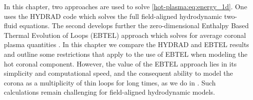 In this chapter, two approaches are used to solve \autoref{hot-plasma:eq:energy_1d}. One uses the HYDRAD code \citep{bradshaw_influence_2013} which solves the full field-aligned hydrodynamic two-fluid equations. The second develops further the zero-dimensional Enthalpy Based Thermal Evolution of Loops (EBTEL) approach which solves for average coronal plasma quantities \citep{klimchuk_highly_2008,cargill_enthalpy-based_2012,cargill_enthalpy-based_2012-1,cargill_modelling_2015}. In this chapter we compare the HYDRAD and EBTEL results and outline some restrictions that apply to the use of EBTEL when modeling the hot coronal component. However, the value of the EBTEL approach lies in its simplicity and computational speed, and the consequent ability to model the corona as a multiplicity of thin loops for long times, as we do in . Such calculations remain challenging for field-aligned hydrodynamic models.

